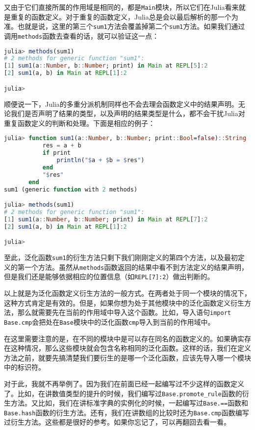 又由于它们直接所属的作用域是相同的，都是\verb|Main|模块，所以它们在Julia看来就是重复的函数定义。对于重复的函数定义，Julia总是会以最后解析的那一个为准。也就是说，这里的第三个\verb|sum1|方法会覆盖掉第二个\verb|sum1|方法。如果我们通过调用\verb|methods|函数去查看的话，就可以验证这一点：

\begin{lstlisting}[language=julia]
julia> methods(sum1)
# 2 methods for generic function "sum1":
[1] sum1(a::Number, b::Number; print) in Main at REPL[5]:2
[2] sum1(a, b) in Main at REPL[1]:2

julia> 
\end{lstlisting}

顺便说一下，Julia的多重分派机制同样也不会去理会函数定义中的结果声明。无论我们是否声明了结果的类型，以及声明的结果类型是什么，都不会干扰Julia对重复函数定义的判断和处理。下面是相应的例子：

\begin{lstlisting}[language=julia]
julia> function sum1(a::Number, b::Number; print::Bool=false)::String
           res = a + b
           if print
               println("$a + $b = $res")
           end
           "$res"
       end
sum1 (generic function with 2 methods)

julia> methods(sum1)
# 2 methods for generic function "sum1":
[1] sum1(a::Number, b::Number; print) in Main at REPL[7]:2
[2] sum1(a, b) in Main at REPL[1]:2

julia> 
\end{lstlisting}

至此，泛化函数\verb|sum1|的衍生方法只剩下我们刚刚定义的第四个方法，以及最初定义的第一个方法。虽然从\verb|methods|函数返回的结果中看不到方法定义的结果声明，但是我们还是能够依据相应的位置信息（如\verb|REPL[7]:2|）做出判断的。

以上就是为泛化函数定义衍生方法的一般方式。在两者处于同一个模块的情况下，这种方式肯定是有效的。但是，如果你想为处于其他模块中的泛化函数定义衍生方法，那么就需要先在当前的作用域中导入这个函数。比如，导入语句\verb|import Base.cmp|会把处在\verb|Base|模块中的泛化函数\verb|cmp|导入到当前的作用域中。

在这里需要注意的是，在不同的模块中是可以存在同名的函数定义的。如果确实存在这种情况，那么这些模块就会包含名称相同的泛化函数。这样的话，我们在定义方法之前，就要先搞清楚我们要衍生的是哪一个泛化函数，应该先导入哪一个模块中的标识符。

对于此，我就不再举例了。因为我们在前面已经一起编写过不少这样的函数定义了。比如，在讲数值类型的提升的时候，我们编写过\verb|Base.promote_rule|函数的衍生方法。又比如，我们在讲标准字典的实例化的时候，一起编写过\verb|Base.==|函数和\verb|Base.hash|函数的衍生方法。还有，我们在讲数组的比较时还为\verb|Base.cmp|函数编写过衍生方法。这些都是很好的参考。如果你忘记了，可以再翻回去看一看。

